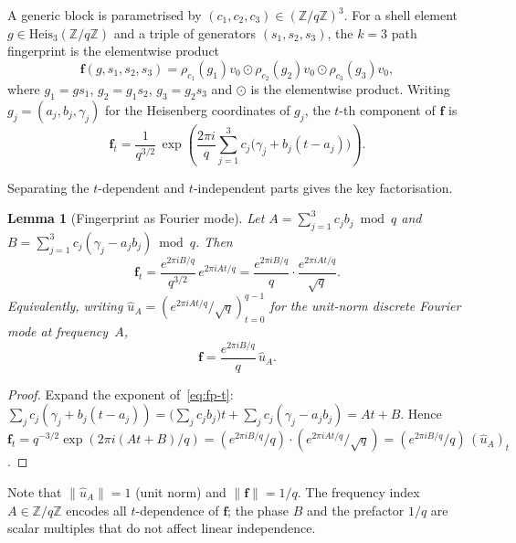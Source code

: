 \documentclass[11pt]{article}
\newtheorem{lemma}[theorem]{Lemma}
\newcommand{\Heis}{\mathrm{Heis}}
\newcommand{\fp}{\mathbf{f}}
\newcommand{\ue}{\hat{u}}
\begin{document}
    A generic block is parametrised by $(c_1,c_2,c_3)\in(\mathbb{Z}/q\mathbb{Z})^3$.
    For a shell element $g\in\Heis_3(\mathbb{Z}/q\mathbb{Z})$ and a triple of generators
    $(s_1,s_2,s_3)$, the $k{=}3$ path fingerprint is the elementwise product
    \begin{equation}
      \label{eq:fp}
      \fp(g,s_1,s_2,s_3)
      =
      \rho_{c_1}(g_1)v_0
      \odot
      \rho_{c_2}(g_2)v_0
      \odot
      \rho_{c_3}(g_3)v_0,
    \end{equation}
    where $g_1=gs_1$, $g_2=g_1s_2$, $g_3=g_2s_3$ and $\odot$ is the elementwise
    product.
    Writing $g_j=(a_j,b_j,\gamma_j)$ for the Heisenberg coordinates of $g_j$, the
    $t$-th component of $\fp$ is
    \begin{equation}
      \label{eq:fp-t}
      \fp_t
      =
      \frac{1}{q^{3/2}}\,
      \exp\!\left(\frac{2\pi i}{q}
              \sum_{j=1}^3 c_j\bigl(\gamma_j+b_j(t-a_j)\bigr)
      \right).
    \end{equation}

    Separating the $t$-dependent and $t$-independent parts gives the key factorisation.

    \begin{lemma}[Fingerprint as Fourier mode]
      \label{lem:fourier}
      Let $A=\sum_{j=1}^3 c_jb_j\bmod q$ and
      $B=\sum_{j=1}^3 c_j(\gamma_j - a_jb_j)\bmod q$.
      Then
      \[
        \fp_t = \frac{e^{2\pi iB/q}}{q^{3/2}}\,e^{2\pi iAt/q}
        = \frac{e^{2\pi iB/q}}{q}\cdot\frac{e^{2\pi iAt/q}}{\sqrt{q}}.
      \]
      Equivalently, writing $\ue_A=(e^{2\pi iAt/q}/\sqrt{q})_{t=0}^{q-1}$ for the
      unit-norm discrete Fourier mode at frequency~$A$,
      \[
        \fp = \frac{e^{2\pi iB/q}}{q}\,\ue_A.
      \]
    \end{lemma}

    \begin{proof}
      Expand the exponent of~\eqref{eq:fp-t}:
      $\sum_j c_j(\gamma_j+b_j(t-a_j)) = \bigl(\sum_j c_j b_j\bigr)t
      + \sum_j c_j(\gamma_j-a_jb_j) = At + B$.
      Hence $\fp_t = q^{-3/2}\exp(2\pi i(At+B)/q) = (e^{2\pi iB/q}/q)\cdot(e^{2\pi iAt/q}/\sqrt{q})
      = (e^{2\pi iB/q}/q)\,(\ue_A)_t$.
    \end{proof}

    Note that $\|\ue_A\|=1$ (unit norm) and $\|\fp\|=1/q$.
    The frequency index $A\in\mathbb{Z}/q\mathbb{Z}$ encodes all $t$-dependence of
    $\fp$; the phase $B$ and the prefactor $1/q$ are scalar multiples that do not affect
    linear independence.
\end{document}
